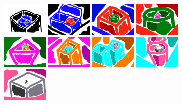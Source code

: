 \documentclass[review,draft]{acmsiggraph}
\begin{document}
\begin{figure}
    \centering
        \includegraphics[width=0.195\textwidth]{images/zoom61}
        \includegraphics[width=0.195\textwidth]{images/zoom62}
        \includegraphics[width=0.195\textwidth]{images/zoom63}
        \includegraphics[width=0.195\textwidth]{images/zoom64}
        \includegraphics[width=0.195\textwidth]{images/zoom65}
        \includegraphics[width=0.195\textwidth]{images/zoom66}
        \includegraphics[width=0.195\textwidth]{images/zoom67}
        \includegraphics[width=0.195\textwidth]{images/zoom68}
        \includegraphics[width=0.195\textwidth]{images/zoom69}

\end{figure}
\end{document}
